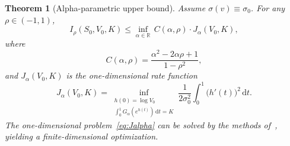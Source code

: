 \documentclass[12pt]{article}
\newtheorem{theorem}{Theorem}[section]
\newcommand{\R}{\mathbb{R}}
\newcommand{\dd}{\mathrm{d}}
\begin{document}
\begin{theorem}[Alpha-parametric upper bound]\label{thm:alpha}
Assume $\sigma(v)\equiv\sigma_0$. For any $\rho\in(-1,1)$,
\begin{equation}\label{eq:alpha_bound}
I_\rho(S_0,V_0,K) \leq \inf_{\alpha\in\R}\,C(\alpha,\rho)\cdot J_\alpha(V_0,K),
\end{equation}
where
\begin{equation}\label{eq:Calpha}
C(\alpha,\rho) = \frac{\alpha^2 - 2\alpha\rho + 1}{1-\rho^2},
\end{equation}
and $J_\alpha(V_0,K)$ is the one-dimensional rate function
\begin{equation}\label{eq:Jalpha}
J_\alpha(V_0,K) = \inf_{\substack{h(0)=\log V_0 \\
  \int_0^1 G_\alpha(e^{h(t)})\,\dd t = K}}
  \frac{1}{2\sigma_0^2}\int_0^1 \bigl(h'(t)\bigr)^2\,\dd t.
\end{equation}
The one-dimensional problem~\eqref{eq:Jalpha} can be solved by the methods
of~\cite{PZ2023}, yielding a finite-dimensional optimization.
\end{theorem}
\end{document}
